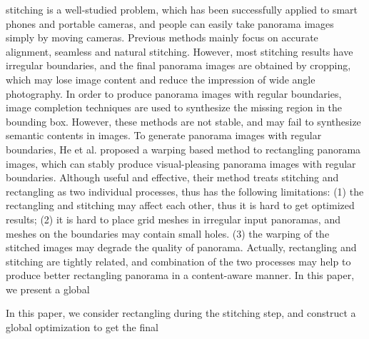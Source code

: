 \documentclass[10pt,journal,compsoc]{IEEEtran}
\begin{document}
\maketitle


\IEEEdisplaynontitleabstractindextext

\IEEEpeerreviewmaketitle



 stitching is a well-studied problem, which has been successfully applied to smart phones and portable cameras, and people can easily take panorama images simply by moving cameras. Previous methods \cite{journals/ftcgv/Szeliski06,journals/pami/ZaragozaCTBS14,conf/eccv/ChenC16}mainly focus on accurate alignment, seamless and natural stitching.
However, most stitching results have irregular boundaries, and the final panorama images are obtained by cropping, which may lose image content and reduce the impression of wide angle photography. In order to produce panorama images with regular boundaries, image completion techniques\cite{journals/mta/YenYC17,journals/tog/BarnesSFG09} are used to synthesize the missing region in the bounding box. However, these methods are not stable, and may fail to synthesize semantic contents in images.
To generate panorama images with regular boundaries, He et al. \cite{journals/tog/HeC013} proposed a warping based method to rectangling panorama images, which can stably produce visual-pleasing panorama images with regular boundaries. Although useful and effective, their method treats stitching and rectangling as two individual processes, thus has the following limitations: (1) the rectangling and stitching may affect each other, thus it is hard to get optimized results; (2) it is hard to place grid meshes in irregular input panoramas, and meshes on the boundaries may contain small holes. (3) the warping of the stitched images may degrade the quality of panorama.
Actually, rectangling and stitching are tightly related, and combination of the two processes may help to produce better rectangling panorama in a content-aware manner.
In this paper, we present a global



In this paper, we consider rectangling during the stitching step, and construct a global optimization to get the final
\end{document}
